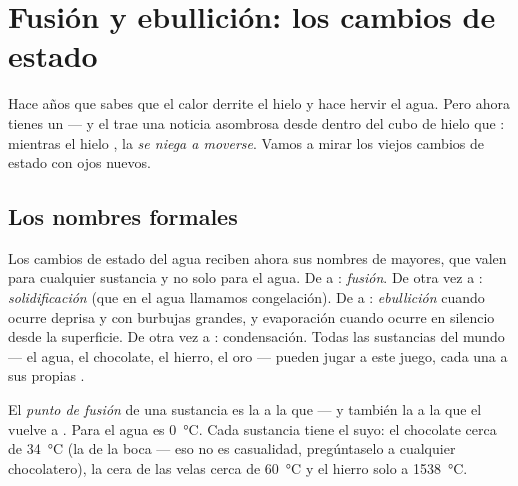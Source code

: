 \chapter{Fusión y ebullición: los cambios de estado}\label{ch:g4:changes-of-state}

Hace años que sabes que el calor derrite el hielo y hace hervir el
agua. Pero ahora tienes un  --- y el  trae una
noticia asombrosa desde dentro del cubo de hielo que :
mientras el hielo , la  \emph{se niega a
moverse}. Vamos a mirar los viejos cambios de estado con ojos nuevos.

\section{Los nombres formales}

Los cambios de estado del agua reciben ahora sus nombres de mayores,
que valen para cualquier sustancia y no solo para el agua. De
 a : \emph{fusión}. De  otra vez
a : \emph{solidificación} (que en el agua
llamamos congelación). De  a :
\emph{ebullición} cuando ocurre deprisa y con
burbujas grandes, y evaporación cuando ocurre en silencio desde la
superficie. De  otra vez a : condensación. Todas las
sustancias del mundo --- el agua, el chocolate, el hierro, el oro ---
pueden jugar a este juego, cada una a sus propias .

\begin{definition}\label{def:g4:changes-of-state:melting-point}
El \emph{punto de fusión} de una sustancia es
la  a la que  --- y también la
 a la que el  vuelve a . Para el agua
es \qty{0}{\celsius}. Cada sustancia tiene el suyo: el chocolate
 cerca de \qty{34}{\celsius} (la  de la boca
--- eso no es casualidad, pregúntaselo a cualquier chocolatero), la
cera de las velas cerca de \qty{60}{\celsius} y el hierro solo a
\qty{1538}{\celsius}.
\end{definition}

